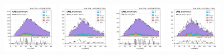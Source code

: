 \begin{figure}
    
    \includegraphics[width=0.24\textwidth]{appendices/qcdSF/figures/mutau_>=2_==1_dilepton_mass.png}
    \includegraphics[width=0.24\textwidth]{appendices/qcdSF/figures/mutau_ss_>=2_==1_dilepton_mass.png}
    \includegraphics[width=0.24\textwidth]{appendices/qcdSF/figures/etau_>=2_==1_dilepton_mass.png}
    \includegraphics[width=0.24\textwidth]{appendices/qcdSF/figures/etau_ss_>=2_==1_dilepton_mass.png}
    

\end{figure}
